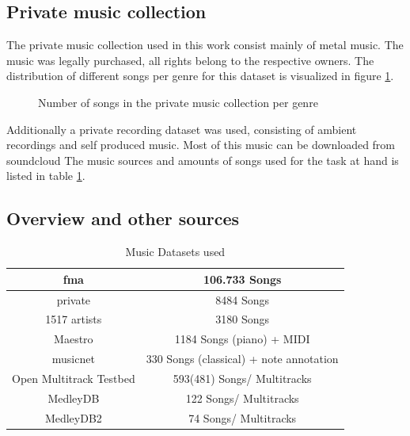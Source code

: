 \subsection{Private music collection}

The private music collection used in this work consist mainly of metal music. The music was legally purchased, all rights belong to the respective owners. The distribution of different songs per genre for this dataset is visualized in figure \ref{privmusdist}.

\begin{figure}[thpb]
	\centering
	\caption{Number of songs in the private music collection per genre}
	\label{privmusdist}
\end{figure}
\FloatBarrier

Additionally a private recording dataset was used, consisting of ambient recordings and self produced music. Most of this music can be downloaded from soundcloud\cite{bqpd1}
The music sources and amounts of songs used for the task at hand is listed in table \ref{table_dsets}.

\subsection{Overview and other sources}

\begin{table}[h]
	\caption{Music Datasets used}
	\label{table_dsets}
	\begin{center}
		\begin{tabular}{|c||c|}
			\hline
			fma & 106.733 Songs\\
			\hline
			private & 8484 Songs\\
			\hline
			1517 artists & 3180 Songs\\
			\hline
			Maestro & 1184 Songs (piano) + MIDI\\
			\hline
			musicnet & 330 Songs (classical) + note annotation\\
			\hline
			Open Multitrack Testbed & 593(481) Songs/ Multitracks\\
			\hline
			MedleyDB &  122 Songs/ Multitracks\\
			\hline
			MedleyDB2 &  74 Songs/ Multitracks\\
			\hline
		\end{tabular}
	\end{center}
\end{table}

